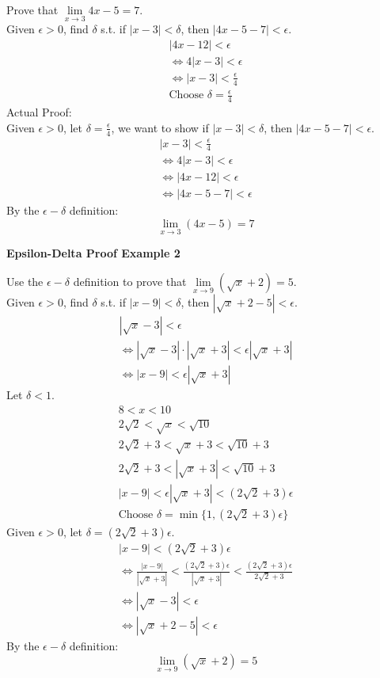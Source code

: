 \documentclass{article}
\begin{document}
Prove that $\lim\limits_{x \to 3} 4x-5=7$.\\
Given $\epsilon > 0$, find $\delta$ s.t. if $|x-3|<\delta$, then $|4x-5-7|<\epsilon$.
\begin{gather*}
    |4x-12|<\epsilon\\
    \iff 4|x-3|<\epsilon\\
    \iff |x-3|<\frac{\epsilon}{4}\\
    \boxed{\text{Choose } \delta=\frac{\epsilon}{4}}
\end{gather*}
Actual Proof:\\
Given $\epsilon > 0$, let $\delta=\frac{\epsilon}{4}$, we want to show if $|x-3|<\delta$, then $|4x-5-7|<\epsilon$.
\begin{gather*}
    |x-3|<\frac{\epsilon}{4}\\
    \iff 4|x-3|<\epsilon\\
    \iff |4x-12|<\epsilon\\
    \iff |4x-5-7|<\epsilon
\end{gather*}
By the $\epsilon-\delta$ definition:
\[
\boxed{\lim_{x\to 3} (4x-5) = 7}
\]

\textbf{Epsilon-Delta Proof Example 2}

Use the $\epsilon - \delta$ definition to prove that $\lim\limits_{x\to9}(\sqrt{x}+2)=5$.\\
Given $\epsilon > 0$, find $\delta$ s.t. if $|x-9|<\delta$, then $|\sqrt{x}+2-5|<\epsilon$.
\begin{gather*}
    |\sqrt{x}-3|<\epsilon\\
    \iff |\sqrt{x}-3|\cdot|\sqrt{x}+3|<\epsilon|\sqrt{x}+3|\\
    \iff |x-9|<\epsilon|\sqrt{x}+3|
\end{gather*}
Let $\delta<1$.
\begin{gather*}
    8<x<10\\
    2\sqrt{2}<\sqrt{x}<\sqrt{10}\\
    2\sqrt{2}+3<\sqrt{x}+3<\sqrt{10}+3\\
    2\sqrt{2}+3<|\sqrt{x}+3|<\sqrt{10}+3\\
    |x-9|<\epsilon|\sqrt{x}+3|<(2\sqrt{2}+3)\epsilon\\
    \boxed{\text{Choose } \delta=\min\{1,(2\sqrt{2}+3)\epsilon\}}
\end{gather*}
Given $\epsilon > 0$, let $\delta=(2\sqrt{2}+3)\epsilon$.
\begin{gather*}
    |x-9|<(2\sqrt{2}+3)\epsilon\\
    \iff \frac{|x-9|}{|\sqrt{x}+3|}<\frac{(2\sqrt{2}+3)\epsilon}{|\sqrt{x}+3|}<\frac{(2\sqrt{2}+3)\epsilon}{2\sqrt{2}+3}\\
    \iff |\sqrt{x}-3|<\epsilon\\
    \iff |\sqrt{x}+2-5|<\epsilon
\end{gather*}
By the $\epsilon-\delta$ definition:
\[
\boxed{\lim\limits_{x\to9}(\sqrt{x}+2)=5}
\]
\end{document}
